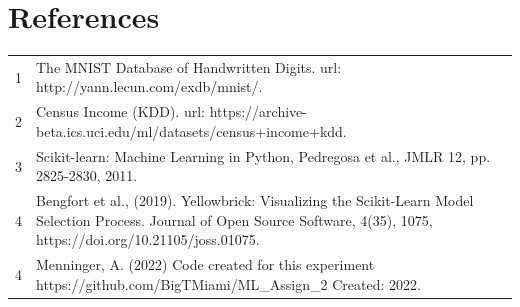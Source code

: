 \documentclass[letterpaper]{article} %
\begin{document}
\section{References}
\begin{tabular}{l p{2.75in}}
\\
1 & The MNIST Database of Handwritten Digits. url: http://yann.lecun.com/exdb/mnist/.
\\
2 & Census Income (KDD). url: https://archive-beta.ics.uci.edu/ml/datasets/census+income+kdd.
\\
3 & Scikit-learn: Machine Learning in Python, Pedregosa et al., JMLR 12, pp. 2825-2830, 2011.
\\
4 & Bengfort et al., (2019). Yellowbrick: Visualizing the Scikit-Learn Model Selection Process. Journal of Open Source Software, 4(35), 1075, https://doi.org/10.21105/joss.01075.
\\
4 & Menninger, A. (2022)  Code created for this experiment https://github.com/BigTMiami/ML\_Assign\_2  Created: 2022.
\end{tabular}
\end{document}
